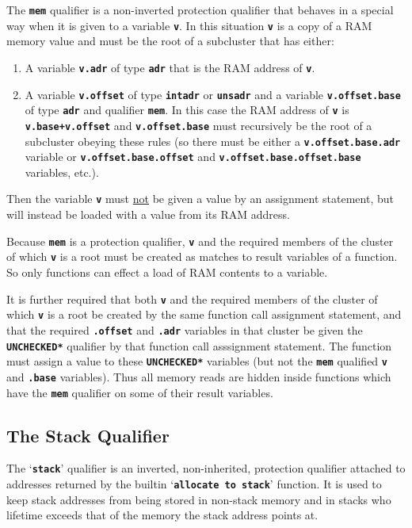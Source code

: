 \documentclass[12pt]{article}
\makeatletter
\newcommand{\TT}[1]{{\tt \bfseries #1}}
\newcommand{\ttkey}[1]{\TT{#1}\index{#1@{\tt #1}}}
\makeatother
\begin{document}
The \ttkey{mem} qualifier is a non-inverted protection qualifier that behaves
in a special way when it is given to a variable \TT{v}.
In this situation \TT{v} is a copy of a RAM memory value and
must be the root of a subcluster that
has either:
\begin{enumerate}
\item
A variable \TT{v.adr} of type \TT{adr} that is the RAM address of \TT{v}.

\item
A variable \TT{v.offset} of type \TT{intadr} or \TT{unsadr} and
a variable \TT{v.offset.base} of type \TT{adr} and qualifier \TT{mem}.
In this case the RAM address of \TT{v} is \TT{v.base+v.offset} and
\TT{v.offset.base} must recursively be the root of a subcluster obeying
these rules (so there must be either a \TT{v.offset.base.adr} variable
or \TT{v.offset.base.offset} and \TT{v.offset.base.offset.base}
variables, etc.).
\end{enumerate}
Then the
variable \TT{v} must \underline{not} be given a value by an
assignment statement, but will instead be loaded with a value
from its RAM address.

Because \TT{mem} is a protection qualifier, \TT{v} and the required
members of the cluster of which \TT{v} is a root
must be created as matches to result variables of a function.
So only functions can effect a load of RAM contents to a variable.

It is further required that both \TT{v} and the required members of
the cluster of which \TT{v} is a root be created
by the same function call assignment statement, and that the required
\TT{.offset} and \TT{.adr} variables in that cluster
be given the \TT{*UNCHECKED*} qualifier by that function
call asssignment statement.
The function must assign a value to these \TT{*UNCHECKED*} variables
(but not the \TT{mem} qualified \TT{v} and \TT{.base} variables).
Thus all memory reads are hidden
inside functions which have the \TT{mem} qualifier on some of
their result variables.


\subsection{The Stack Qualifier}
\label{THE-STACK-QUALIFIER}

The `\ttkey{stack}' qualifier is an inverted, non-inherited,
protection qualifier
attached to addresses returned by the builtin `\TT{allocate to stack}'
function.  It is used to keep stack addresses from being stored in
non-stack memory and in stacks who lifetime exceeds that of the
memory the stack address points at.
\end{document}
